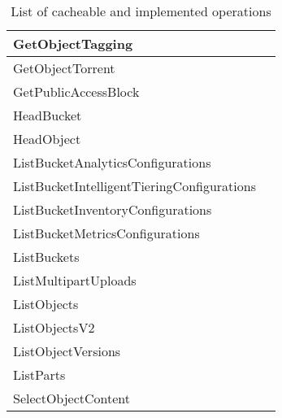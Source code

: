 \begin{table}[!hbpt]
\begin{center}
\begin{tabular}{| l | l |}
			GetObjectTagging & \xmark \\ \hline
			GetObjectTorrent & \xmark \\ \hline
			GetPublicAccessBlock & \xmark \\ \hline
			HeadBucket & \cmark \\ \hline
			HeadObject & \cmark \\ \hline
			ListBucketAnalyticsConfigurations & \xmark \\ \hline
			ListBucketIntelligentTieringConfigurations & \xmark \\ \hline
			ListBucketInventoryConfigurations & \xmark \\ \hline
			ListBucketMetricsConfigurations & \xmark \\ \hline
			ListBuckets & \cmark \\ \hline
			ListMultipartUploads & \xmark \\ \hline
			ListObjects & \cmark \\ \hline
			ListObjectsV2 & \cmark \\ \hline
			ListObjectVersions & \cmark \\ \hline
			ListParts & \xmark \\ \hline
			SelectObjectContent & \xmark \\ \hline
		\end{tabular}
	\end{center}
	\caption{List of cacheable and implemented operations}
	\label{appendix:tab:cachedops}
\end{table}

